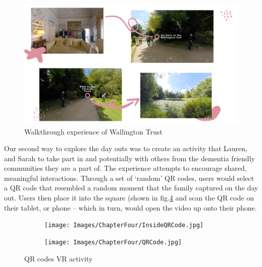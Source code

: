 \begin{figure}
\centering
\includegraphics[width=.8\linewidth]{Images/ChapterFour/WalktrhoughOfWallington.png}
\caption{Walkthrough experience of Wallington Trust}
\label{fig:wallingtonTrust}
\end{figure}

Our second way to explore the day outs was to create an activity that Lauren, and Sarah to take part in and potentially with others from the dementia friendly communities they are a part of. The experience attempts to encourage shared, meaningful interactions. Through a set of ‘random’ QR codes, users would select a QR code that resembled a random moment that the family captured on the day out. Users then place it into the square (shown in fig.\ref{fig:QRcodes} and scan the QR code on their tablet, or phone – which in turn, would open the video up onto their phone.

\begin{figure}
\centering
\begin{subfigure}{.5\textwidth}
  \centering
  \texttt{[image: Images/ChapterFour/InsideQRCode.jpg]}
  \label{fig:insideQRBox}
\end{subfigure}%
\begin{subfigure}{.5\textwidth}
  \centering
  \texttt{[image: Images/ChapterFour/QRCode.jpg]}
  \label{fig:QRCode}
\end{subfigure}
\caption{QR codes VR activity}
\label{fig:QRcodes}
\end{figure}

